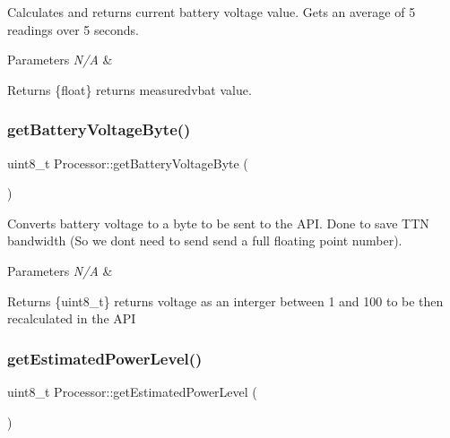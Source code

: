 Calculates and returns current battery voltage value. Gets an average of 5 readings over 5 seconds. 
\begin{DoxyParams}{Parameters}
{\em N/A} & \\
\hline
\end{DoxyParams}
\begin{DoxyReturn}{Returns}
\{float\} returns measuredvbat value. 
\end{DoxyReturn}
\mbox{\label{class_processor_ae2385e41f86895199fb37e524a3f1e86}} 
\subsubsection{\texorpdfstring{get\+Battery\+Voltage\+Byte()}{getBatteryVoltageByte()}}
{\footnotesize\ttfamily uint8\+\_\+t Processor\+::get\+Battery\+Voltage\+Byte (\begin{DoxyParamCaption}{ }\end{DoxyParamCaption})}

Converts battery voltage to a byte to be sent to the A\+PI. Done to save T\+TN bandwidth (So we don\textquotesingle{}t need to send send a full floating point number). 
\begin{DoxyParams}{Parameters}
{\em N/A} & \\
\hline
\end{DoxyParams}
\begin{DoxyReturn}{Returns}
\{uint8\+\_\+t\} returns voltage as an interger between 1 and 100 to be then recalculated in the A\+PI 
\end{DoxyReturn}
\mbox{\label{class_processor_a78b74d3be91182a263f77ff0f250408d}} 
\subsubsection{\texorpdfstring{get\+Estimated\+Power\+Level()}{getEstimatedPowerLevel()}}
{\footnotesize\ttfamily uint8\+\_\+t Processor\+::get\+Estimated\+Power\+Level (\begin{DoxyParamCaption}{ }\end{DoxyParamCaption})}

